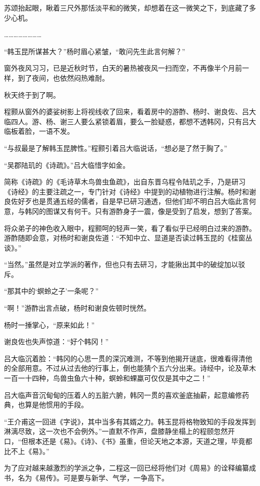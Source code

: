 苏颂抬起眼，瞅着三尺外那恬淡平和的微笑，却想着在这一微笑之下，到底藏了多少心机。

……………………

“韩玉昆所谋甚大？”杨时眉心紧皱，“敢问先生此言何解？”

窗外夜风习习，已是近秋时节，白天的暑热被夜风一扫而空，不再像半个月前一样，到了夜间，也依然闷热难耐。

秋天终于到了啊。

程颢从窗外的婆娑树影上将视线收了回来，看着房中的游酢、杨时、谢良佐、吕大临四人。游、杨、谢三人要么紧锁着眉，要么一脸疑惑，都想不透韩冈，只有吕大临板着脸，一语不发。

“与叔最是了解韩玉昆脾性。”程颢引着吕大临说话，“想必是了然于胸了。”

“吴郡陆玑的《诗疏》。”吕大临惜字如金。

简称《诗疏》的《毛诗草木鸟兽虫鱼疏》，出自东晋乌程令陆玑之手，乃是研习《诗经》的主要注疏之一，专门针对《诗经》中提到的动植物进行注解。杨时和谢良佐好歹也是贯通五经的儒者，自是早已研习通透，但他们却不明白吕大临此言何意，与韩冈的图谋又有何干。只有游酢身子一震，像是受到了启发，想到了答案。

将众弟子的神色收入眼中，程颢呵的轻声一笑，看了看似乎已经明白过来的游酢。游酢随即会意，对杨时和谢良佐道：“不知中立、显道是否读过韩玉昆的《桂窗丛谈》。”

“当然。”虽然是对立学派的著作，但也只有去研习，才能揪出其中的破绽加以驳斥。

“那其中的‘螟蛉之子’一条呢？”

“啊！”游酢出言点破，杨时和谢良佐顿时恍然。

杨时一捶掌心，“原来如此！”

谢良佐也失声惊道：“好个韩冈！”

吕大临沉着脸：“韩冈的心思一贯的深沉难测，不等到他揭开谜底，很难看得清他的全部用意。不过从过去他的行事上，倒也能猜个五六分出来。诗经中，论及草木一百一十四种，鸟兽虫鱼六十种，螟蛉和蜾蠃可仅仅是其中之二！”

吕大临声音沉甸甸的压着人的五脏六腑，韩冈一贯的喜欢釜底抽薪，起意编修药典，也算是他惯用的手段。

“王介甫这一回进《字说》，其中当多有其婿之力。韩玉昆将格物致知的手段发挥到淋漓尽致，这一次也不会例外。”一直默不作声，盘膝静坐榻上的程颐忽然开口，“但根本还是《易》。《诗》、《书》虽重，但论天地之本源，天道之理，毕竟都比不上《易》。”

为了应对越来越激烈的学派之争，二程这一回已经将他们对《周易》的诠释编纂成书，名为《易传》。可是要与新学、气学，一争高下。

